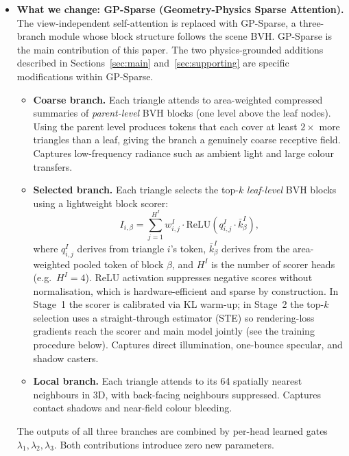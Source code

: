 \documentclass[11pt,letterpaper]{article}
\begin{document}
\begin{itemize}
  \item \textbf{What we change: GP-Sparse (Geometry-Physics Sparse Attention).}
    The view-independent self-attention is replaced with GP-Sparse,
    a three-branch module whose block structure follows the scene BVH.
    GP-Sparse is the main contribution of this paper.
    The two physics-grounded additions described in Sections~\ref{sec:main}
    and~\ref{sec:supporting} are specific modifications within GP-Sparse.
    \begin{itemize}
      \item \textbf{Coarse branch.} Each triangle attends to area-weighted
        compressed summaries of \emph{parent-level} BVH blocks (one level
        above the leaf nodes). Using the parent level produces tokens that
        each cover at least $2\times$ more triangles than a leaf, giving
        the branch a genuinely coarse receptive field. Captures low-frequency
        radiance such as ambient light and large colour transfers.
      \item \textbf{Selected branch.} Each triangle selects the top-$k$
        \emph{leaf-level} BVH blocks using a lightweight block scorer:
        \[
          I_{i,\beta} = \sum_{j=1}^{H^I} w^I_{i,j}
                        \cdot \mathrm{ReLU}\!\left(q^I_{i,j}
                        \cdot \bar{k}^I_\beta\right),
        \]
        where $q^I_{i,j}$ derives from triangle $i$'s token,
        $\bar{k}^I_\beta$ derives from the area-weighted pooled token of
        block $\beta$, and $H^I$ is the number of scorer heads (e.g.\
        $H^I = 4$). ReLU activation suppresses negative scores without
        normalisation, which is hardware-efficient and sparse by
        construction. In Stage~1 the scorer is calibrated via KL warm-up;
        in Stage~2 the top-$k$ selection uses a straight-through estimator
        (STE) so rendering-loss gradients reach the scorer and main model
        jointly (see the training procedure below). Captures direct
        illumination, one-bounce specular, and shadow casters.
      \item \textbf{Local branch.} Each triangle attends to its 64
        spatially nearest neighbours in 3D, with back-facing neighbours
        suppressed. Captures contact shadows and near-field colour bleeding.
    \end{itemize}
    The outputs of all three branches are combined by per-head learned
    gates $\lambda_1, \lambda_2, \lambda_3$.
    Both contributions introduce zero new parameters.

\end{itemize}
\end{document}
